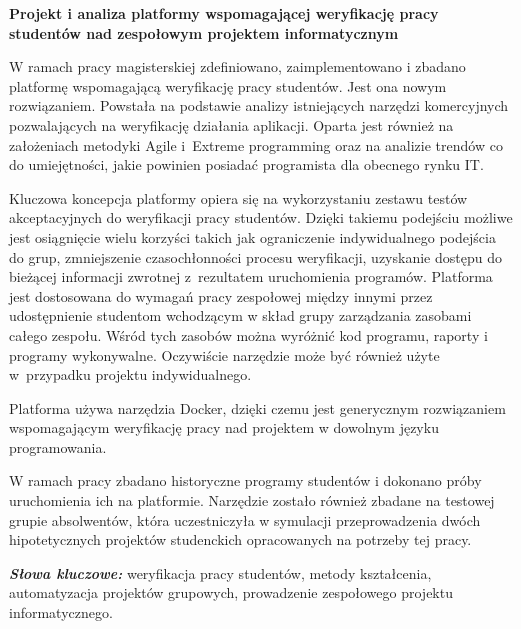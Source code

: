 \newpage
\vspace{10cm}

\newpage
\begin{center}
	\textbf{Projekt i analiza platformy wspomagającej weryfikację pracy studentów
nad zespołowym projektem informatycznym}
\end{center}
 \newline

W ramach pracy magisterskiej zdefiniowano, zaimplementowano i zbadano platformę wspomagającą weryfikację pracy studentów.
Jest ona nowym rozwiązaniem.
Powstała na podstawie analizy istniejących narzędzi komercyjnych pozwalających na weryfikację działania aplikacji.
Oparta jest również na założeniach metodyki Agile i~Extreme programming oraz na analizie trendów co do umiejętności, jakie powinien posiadać programista dla obecnego rynku IT.

Kluczowa koncepcja platformy opiera się na wykorzystaniu zestawu testów akceptacyjnych do weryfikacji pracy studentów.
Dzięki takiemu podejściu możliwe jest osiągnięcie wielu korzyści takich jak ograniczenie indywidualnego podejścia do grup, zmniejszenie czasochłonności procesu weryfikacji, uzyskanie dostępu do bieżącej informacji zwrotnej z~rezultatem uruchomienia programów.
Platforma jest dostosowana do wymagań pracy zespołowej między innymi przez udostępnienie studentom wchodzącym w skład grupy zarządzania zasobami całego zespołu.
Wśród tych zasobów można wyróżnić kod programu, raporty i programy wykonywalne.
Oczywiście narzędzie może być również użyte w~przypadku projektu indywidualnego.

Platforma używa narzędzia Docker, dzięki czemu jest generycznym rozwiązaniem wspomagającym weryfikację pracy nad projektem w dowolnym języku programowania.

W ramach pracy zbadano historyczne programy studentów i dokonano próby uruchomienia ich na platformie.
Narzędzie zostało również zbadane na testowej grupie absolwentów, która uczestniczyła w symulacji przeprowadzenia dwóch hipotetycznych projektów studenckich opracowanych na potrzeby tej pracy. \newline



\textit{\textbf{Słowa kluczowe:}} weryfikacja pracy studentów, metody kształcenia, automatyzacja projektów grupowych, prowadzenie zespołowego projektu informatycznego.

	\vspace{1cm}

